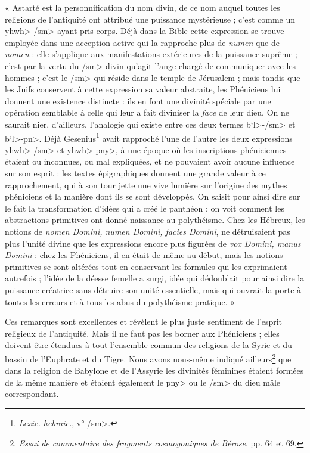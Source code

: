 \documentclass[a4paper, 11pt, oneside]{article}
\begin{document}
« Astarté est la personnification du nom divin, de ce nom auquel toutes les religions de l'antiquité ont attribué une puissance mystérieuse ; c'est comme un \<yhwh>-\</sm> ayant pris corps. Déjà dans la Bible cette expression se trouve employée dans une acception active qui la rapproche plus de \emph{numen} que de \emph{nomen} : elle s'applique aux manifestations extérieures de la puissance suprême ; c'est par la vertu du \</sm> divin qu'agit l'ange chargé de communiquer avec les hommes ; c'est le \</sm> qui réside dans le temple de Jérusalem ; mais tandis que les Juifs conservent à cette expression sa valeur abstraite, les Phéniciens lui donnent une existence distincte : ils en font une divinité spéciale par une opération semblable à celle qui leur a fait diviniser la \emph{face} de leur dieu. On ne saurait nier, d'ailleurs, l'analogie qui existe entre ces deux termes \<b`l>-\</sm> et \<b`l>-\<pn>. Déjà Gesenius\footnote{\emph{Lexic. hebraic.}, v° \</sm>.} avait rapproché l'une de l'autre les deux expressions \<yhwh>-\</sm> et \<yhwh>-\<pny>, à une époque où les inscriptions phéniciennes étaient ou inconnues, ou mal expliquées, et ne pouvaient avoir aucune influence sur son esprit : les textes épigraphiques donnent une grande valeur à ce rapprochement, qui à son tour jette une vive lumière sur l'origine des mythes phéniciens et la manière dont ils se sont développés. On saisit pour ainsi dire sur le fait la transformation d'idées qui a créé le panthéon : on voit comment les abstractions primitives ont donné naissance au polythéisme. Chez les Hébreux, les notions de \emph{nomen Domini, numen Domini, facies Domini}, ne détruisaient pas plus l'unité divine que les expressions encore plus figurées de \emph{vox Domini, manus Domini} : chez les Phéniciens, il en était de même au début, mais les notions primitives se sont altérées tout en conservant les formules qui les exprimaient autrefois ; l'idée de la déesse femelle a surgi, idée qui dédoublait pour ainsi dire la puissance créatrice sans détruire son unité essentielle, mais qui ouvrait la porte à toutes les erreurs et à tous les abus du polythéisme pratique. »

Ces remarques sont excellentes et révèlent le plus juste sentiment de l'esprit religieux de l'antiquité. Mais il ne faut pas les borner aux Phéniciens ; elles doivent être étendues à tout l'ensemble commun des religions de la Syrie et du bassin de l'Euphrate et du Tigre. Nous avons nous-même indiqué ailleurs\footnote{\emph{Essai de commentaire des fragments cosmogoniques de Bérose}, pp. 64 et 69.} que dans la religion de Babylone et de l'Assyrie les divinités féminines étaient formées de la même manière et étaient également le \<pny> ou le \</sm> du dieu mâle correspondant.
\end{document}
